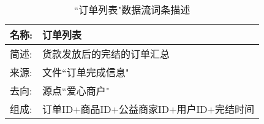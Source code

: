     \begin{table}[H]  
    \caption{``订单列表"数据流词条描述}  
    \begin{center}  
        \begin{tabular}{l p{11cm}} 
            \hline
            \quad 名称:  &   订单列表 \\
            \hline
            \quad 简述:  & 货款发放后的完结的订单汇总 \\
            \hline
            \quad 来源:  & 文件``订单完成信息" \\
            \hline
            \quad 去向:  & 源点``爱心商户" \\
            \hline
            \quad 组成:  & 订单ID+商品ID+公益商家ID+用户ID+完结时间 \\
            \hline
        \end{tabular}
        \label{tab1}
    \end{center}
    \end{table}
    
    